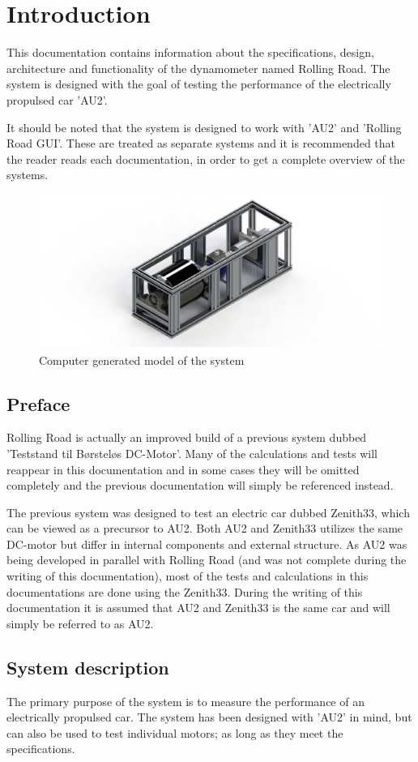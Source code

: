 \chapter{Introduction}
This documentation contains information about the specifications, design, architecture and functionality of the dynamometer named Rolling Road. The system is designed with the goal of testing the performance of the electrically propulsed car 'AU2'.

It should be noted that the system is designed to work with 'AU2' and 'Rolling Road GUI'. These are treated as separate systems and it is recommended that the reader reads each documentation, in order to get a complete overview of the systems.

\begin{figure}[H]
	\centering
	\includegraphics[width=0.5\linewidth]{Introduction/Model}
	\caption{Computer generated model of the system}
	\label{fig:System_model}
\end{figure}

\section{Preface}
Rolling Road is actually an improved build of a previous system dubbed 'Teststand til Børsteløs
DC-Motor'\cite{BAC_rullefelt}. Many of the calculations and tests will reappear in this documentation and in some cases they will be omitted completely and the previous documentation will simply be referenced instead. 

The previous system was designed to test an electric car dubbed Zenith33\cite{BAC_zenith33}, which can be viewed as a precursor to AU2. Both AU2 and Zenith33 utilizes the same DC-motor but differ in internal components and external structure. As AU2 was being developed in parallel with Rolling Road (and was not complete during the writing of this documentation), most of the tests and calculations in this documentations are done using the Zenith33. During the writing of this documentation it is assumed that AU2 and Zenith33 is the same car and will simply be referred to as AU2.

\newpage
\section{System description}
The primary purpose of the system is to measure the performance of an electrically propulsed car. The system has been designed with 'AU2' in mind, but can also be used to test individual motors; as long as they meet the specifications.

